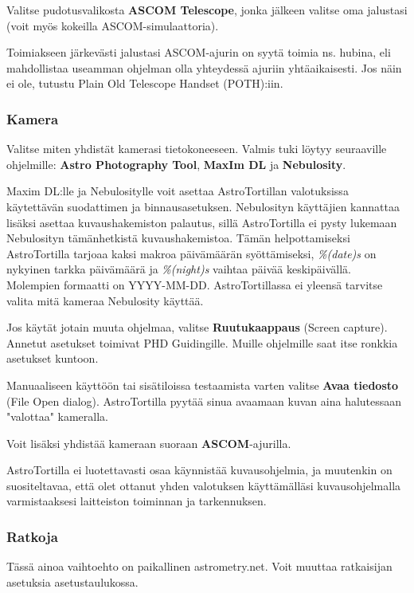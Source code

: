 \documentclass{article}
\begin{document}
Valitse pudotusvalikosta \textbf{ASCOM Telescope}, jonka jälkeen valitse oma jalustasi (voit myös kokeilla ASCOM-simulaattoria).

Toimiakseen järkevästi jalustasi ASCOM-ajurin on syytä toimia ns. hubina, 
eli mahdollistaa useamman ohjelman olla yhteydessä ajuriin yhtäaikaisesti.
Jos näin ei ole, tutustu Plain Old Telescope Handset (POTH):iin.

\subsubsection{Kamera}

Valitse miten yhdistät kamerasi tietokoneeseen. Valmis tuki löytyy seuraaville ohjelmille: \textbf{Astro Photography Tool}, \textbf{MaxIm DL} ja \textbf{Nebulosity}. 

Maxim DL:lle ja Nebulositylle voit asettaa AstroTortillan valotuksissa käytettävän suodattimen ja binnausasetuksen. Nebulosityn käyttäjien kannattaa lisäksi asettaa kuvaushakemiston palautus, sillä AstroTortilla ei pysty lukemaan Nebulosityn tämänhetkistä kuvaushakemistoa. Tämän helpottamiseksi AstroTortilla tarjoaa kaksi makroa päivämäärän syöttämiseksi, \textit{\%(date)s} on nykyinen tarkka päivämäärä ja \textit{\%(night)s} vaihtaa päivää keskipäivällä. Molempien formaatti on YYYY-MM-DD. AstroTortillassa ei yleensä tarvitse valita mitä kameraa Nebulosity käyttää.

Jos käytät jotain muuta ohjelmaa, valitse \textbf{Ruutukaappaus} (Screen capture). Annetut asetukset toimivat PHD Guidingille. 
Muille ohjelmille saat itse ronkkia asetukset kuntoon.

Manuaaliseen käyttöön tai sisätiloissa testaamista varten valitse \textbf{Avaa tiedosto} (File Open dialog). AstroTortilla pyytää sinua avaamaan kuvan aina halutessaan "valottaa" kameralla.

Voit lisäksi yhdistää kameraan suoraan \textbf{ASCOM}-ajurilla.

AstroTortilla ei luotettavasti osaa käynnistää kuvausohjelmia, ja muutenkin on suositeltavaa, että olet ottanut yhden valotuksen käyttämälläsi kuvausohjelmalla varmistaaksesi laitteiston toiminnan ja tarkennuksen.

\subsubsection{Ratkoja}

Tässä ainoa vaihtoehto on paikallinen astrometry.net. Voit muuttaa ratkaisijan asetuksia asetustaulukossa.
\end{document}
